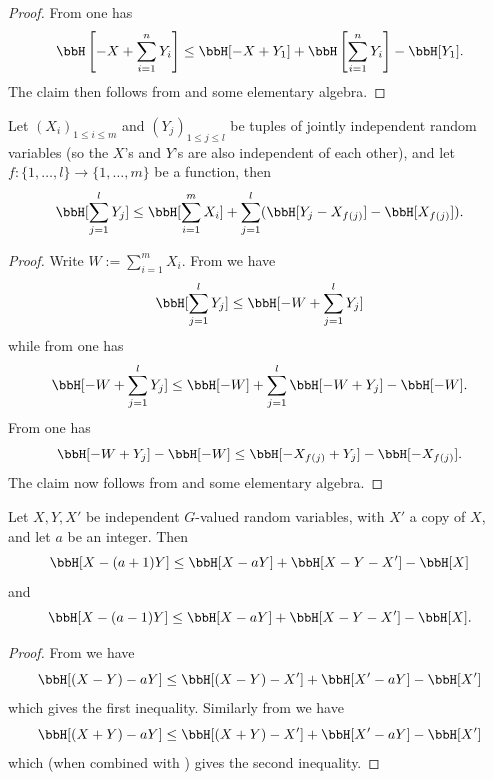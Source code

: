 \begin{proof}\leanok
  From  one has
  $$ \bbH\left[-X + \sum_{i=1}^n Y_i\right] \leq \bbH[ - X + Y_1 ] + \bbH\left[ \sum_{i=1}^n Y_i \right] - \bbH[Y_1].$$
  The claim then follows from  and some elementary algebra.
\end{proof}

\begin{lemma}\label{compare-sums}\leanok  Let $(X_i)_{1 \leq i \leq m}$ and $(Y_j)_{1 \leq j \leq l}$ be tuples of jointly independent random variables (so the $X$'s and $Y$'s are also independent of each other), and let $f: \{1,\dots,l\} \to \{1,\dots,m\}$ be a function, then
  $$ \bbH[\sum_{j=1}^l Y_j] \leq \bbH[ \sum_{i=1}^m X_i ] + \sum_{j=1}^l (\bbH[ Y_j - X_{f(j)}] - \bbH[X_{f(j)}]).$$
\end{lemma}

\begin{proof}\leanok  Write $W := \sum_{i=1}^m X_i$.  From  we have
$$ \bbH[\sum_{j=1}^l Y_j]  \leq \bbH[-W + \sum_{j=1}^l Y_j]$$
while from  one has
$$ \bbH[-W + \sum_{j=1}^l Y_j] \leq \bbH[-W] + \sum_{j=1}^l \bbH[-W + Y_j] - \bbH[-W].$$
From  one has
$$ \bbH[-W + Y_j] - \bbH[-W] \leq \bbH[-X_{f(j)} + Y_j] - \bbH[-X_{f(j)}].$$
The claim now follows from  and some elementary algebra.
\end{proof}

\begin{lemma}
  \label{sum-dilate-I}
  \leanok

  Let $X,Y,X'$ be independent $G$-valued random variables, with $X'$ a copy of $X$,
  and let $a$ be an integer.  Then
  $$\bbH[X-(a+1)Y] \leq \bbH[X-aY] + \bbH[X-Y-X'] - \bbH[X]$$
  and
  $$\bbH[X-(a-1)Y] \leq \bbH[X-aY] + \bbH[X-Y-X'] - \bbH[X].$$
\end{lemma}
\begin{proof}
  \leanok

  From  we have
  $$ \bbH[(X-Y)-aY] \leq \bbH[(X-Y) - X'] + \bbH[X'-aY] - \bbH[X']$$
  which gives the first inequality.  Similarly from  we have
  $$ \bbH[(X+Y)-aY] \leq \bbH[(X+Y) - X'] + \bbH[X'-aY] - \bbH[X']$$
  which (when combined with ) gives the second inequality.
\end{proof}

